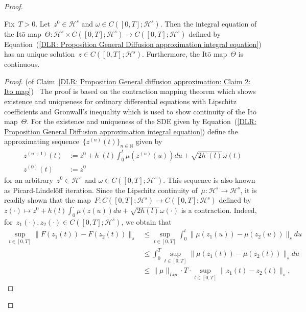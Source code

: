\begin{proof}
  \begin{claim}
    \label{DLR: Proposition General diffusion approximation: Claim 2: Ito map}
  Fix~$T>0$. Let~$z^0 \in \mathcal{H}^s$ and $\omega \in C([0,T];\mathcal{H}^s)$. Then the integral equation of the It\={o} map~$\Theta : \mathcal{H}^s \times C([0,T]; \mathcal{H}^s) \to  C([0,T]; \mathcal{H}^s)$ defined by Equation~(\ref{DLR: Proposition General Diffusion approximation integral equation}) has an unique solution~$z \in C([0,T];\mathcal{H}^s)$. Furthermore, the It\={o} map~$\Theta$ is continuous.
  \end{claim}
  
  \begin{proof} (of Claim~\ref{DLR: Proposition General diffusion approximation: Claim 2: Ito map})~\autocite[Lemma 3.7]{Mattingly2010}
    The proof is based on the contraction mapping theorem which shows existence and uniqueness for ordinary differential equations with Lipschitz coefficients and Gronwall's inequality which is used to show continuity of the It\={o} map~$\Theta$. For the existence and uniqueness of the SDE given by Equation~(\ref{DLR: Proposition General Diffusion approximation integral equation}) define the approximating sequence~$\{ z^{(n)}(t) \}_{n \in \mathbb{N}} $ given by
    \begin{equation}
      \begin{split}
       z^{(n+1)}(t) & := z^0 + h^{\cdot}(l) \int_0^t \mu (z^{(n)}(u)) du + \sqrt{2 h^{\cdot}(l)} \omega(t) \\
       z^{(0)}(t) & := z^0
      \end{split}
    \end{equation}
    for an arbitrary~$z^0 \in \mathcal{H}^s$ and $\omega \in C([0,T];\mathcal{H}^s)$. This sequence is also known as Picard-Lindel\"{o}ff iteration. Since the Lipschitz continuity of~$\mu: \mathcal{H}^s \to \mathcal{H}^s$, it is readily shown that the map~$F: C([0,T];\mathcal{H}^s) \to C([0,T];\mathcal{H}^s)$ defined by~$z(\cdot) \mapsto z^0 + h(l) \int_0^{\cdot} \mu (z(u)) du + \sqrt{2 h(l)} \omega(\cdot)$ is a contraction. Indeed, for~$z_1(\cdot), z_2(\cdot) \in C([0,T];\mathcal{H}^s)$, we obtain that
    \begin{align*}
      \sup_{t \in [0,T]} \| F(z_1(t)) - F(z_2(t)) \|_{s} & \leq \sup_{t \in [0,T]} \int_0^t \| \mu(z_1(u)) - \mu(z_2(u)) \|_{s} du \\
      & \leq \int_0^T \sup_{t \in [0,T]} \| \mu(z_1(t)) - \mu(z_2(t)) \|_{s} du \\
      & \leq \| \mu \|_{Lip} \cdot T \cdot \sup_{t \in [0,T]} \| z_1(t) - z_2(t) \|_{s},

\end{align*}
\end{proof}
\end{proof}
